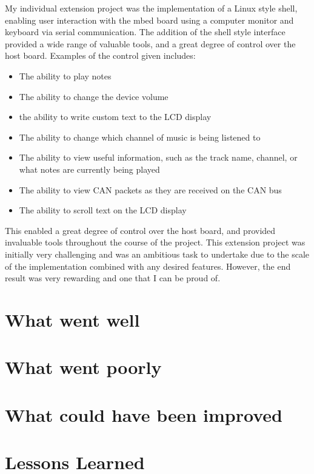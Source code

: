 My individual extension project was the implementation of a Linux style shell, 
enabling user interaction with the mbed board using a computer monitor and 
keyboard via serial communication. The addition of the shell style interface 
provided a wide range of valuable tools, and a great degree of control over the 
host board. Examples of the control given includes: 
\begin{itemize}
    \item The ability to play notes
    \item The ability to change the device volume
    \item the ability to write custom text to the LCD display 
    \item The ability to change which channel of music is being listened to
    \item The ability to view useful information, such as the track name, channel,
or what notes are currently being played
    \item The ability to view CAN packets as they are received on the CAN bus 
    \item The ability to scroll text on the LCD display 
\end{itemize}
This enabled a great degree of control over the host board, and provided 
invaluable tools throughout the course of the project. This extension project 
was initially very challenging and was an ambitious task to undertake due to the 
scale of the implementation combined with any desired features. However, the end 
result was very rewarding and one that I can be proud of. 

\section{What went well}


\section{What went poorly}


\section{What could have been improved}


\section{Lessons Learned}


